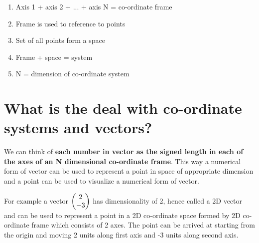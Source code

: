 \documentclass[../main.tex]{subfiles}
\begin{document}
\begin{enumerate}
  \item Axis 1 + axis 2 + ... + axis N = co-ordinate frame
  \item Frame is used to reference to points
  \item Set of all points form a space
  \item Frame + space = system
  \item N = dimension of co-ordinate system
\end{enumerate}

\section{What is the deal with co-ordinate systems and vectors?}
We can think of \textbf{each number in vector as the signed length in each of the axes of an N dimensional co-ordinate frame}.
This way a numerical form of vector can be used to represent a point in space of appropriate dimension and a point can be used to visualize a numerical form of vector.

\begin{figure}[h]
  \centering
\end{figure}


For example a vector $ \blockcomment{Column-Vector: 2, -3} \begin{pmatrix} 2 \\  -3 \end{pmatrix} $  has dimensionality of 2, hence called a 2D vector and can be used to represent a point in a 2D co-ordinate space formed by 2D co-ordinate frame which consists of 2 axes. The point can be arrived at starting from the origin and moving 2 units along first axis and -3 units along second axis.

\begin{figure}[ht]
  \centering
\end{figure}
\end{document}

